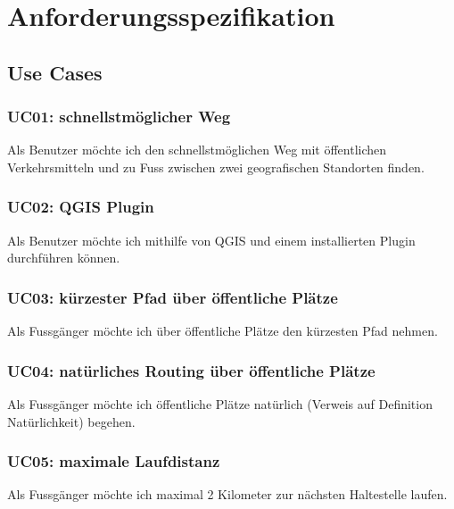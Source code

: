 
\section{Anforderungsspezifikation}
\label{sec:Anforderungsspezifikation}

\subsection{Use Cases}
\label{sub:Use Cases}

\subsubsection{UC01: schnellstmöglicher Weg}
\label{usecase:UC01}

Als Benutzer möchte ich den schnellstmöglichen Weg mit öffentlichen Verkehrsmitteln und zu Fuss zwischen zwei geografischen Standorten finden.

\subsubsection{UC02: QGIS Plugin}
\label{usecase:UC02}

Als Benutzer möchte ich mithilfe  von QGIS und einem installierten Plugin durchführen können.

\subsubsection{UC03: kürzester Pfad über öffentliche Plätze}
\label{usecase:UC03}

Als Fussgänger möchte ich über öffentliche Plätze den kürzesten Pfad nehmen.

\subsubsection{UC04: natürliches Routing über öffentliche Plätze}
\label{usecase:UC04}

Als Fussgänger möchte ich öffentliche Plätze natürlich (Verweis auf Definition Natürlichkeit) begehen.

\subsubsection{UC05: maximale Laufdistanz}
\label{usecase:UC05}

Als Fussgänger möchte ich maximal 2 Kilometer zur nächsten Haltestelle laufen.

